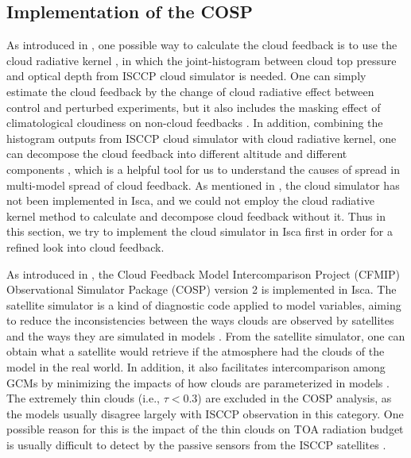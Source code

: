 \subsection{Implementation of the COSP}
\label{sec:implementation_of_cosp}

As introduced in , one possible way to calculate the cloud feedback is to use the cloud radiative kernel \citep{Zelinka2012computing1,Zelinka2012computing2}, in which the joint-histogram between cloud top pressure and optical depth from ISCCP cloud simulator \citep{Klein1999validation,Webb2001combining} is needed. One can simply estimate the cloud feedback by the change of cloud radiative effect between control and perturbed experiments, but it also includes the masking effect of climatological cloudiness on non-cloud feedbacks \citep{Soden2004}. In addition, combining the histogram outputs from ISCCP cloud simulator with cloud radiative kernel, one can decompose the cloud feedback into  different altitude and different components \citep{Zelinka2012computing2,Zelinka2016insights}, which is a helpful tool for us to understand the causes of spread in multi-model spread of cloud feedback. As mentioned in , the cloud simulator has not been implemented in Isca, and we could not employ the cloud radiative kernel method to calculate and decompose cloud feedback without it. Thus in this section, we try to implement the cloud simulator in Isca first in order for a refined look into cloud feedback.

As introduced in , the Cloud Feedback Model Intercomparison Project (CFMIP) Observational Simulator Package (COSP) version 2 \citep{Swales2018} is implemented in Isca. The satellite simulator is a kind of diagnostic code applied to model variables, aiming to reduce the inconsistencies between the ways clouds are observed by satellites and the ways they are simulated in models \citep{BodasSalcedo2011}. From the satellite simulator, one can obtain what a satellite would retrieve if the atmosphere had the clouds of the model in the real world. In addition, it also facilitates intercomparison among GCMs by minimizing the impacts of how clouds are parameterized in models \citep[e.g.][]{Klein2013climate}. The extremely thin clouds (i.e., $\tau<$0.3) are excluded in the COSP analysis, as the models usually disagree largely with ISCCP observation in this category. One possible reason for this is the impact of the thin clouds on TOA radiation budget is usually difficult to detect by the passive sensors from the ISCCP satellites \citep{Klein2013climate}.

